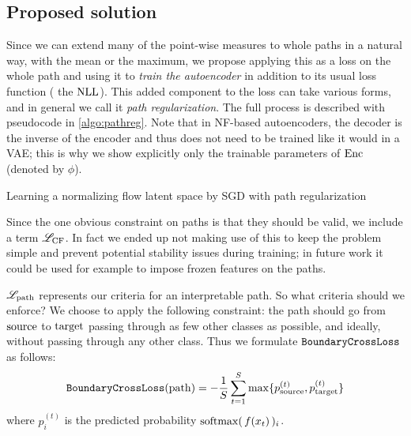 \documentclass[../main.tex]{subfiles}
\begin{document}
\subsection{Proposed solution}

Since we can extend many of the point-wise measures to whole paths in a natural way, \eg{} with the mean or the maximum, we propose applying this as a loss on the whole path and using it to \emph{train the autoencoder} in addition to its usual loss function (\eg{} the $\text{NLL}$).
This added component to the loss can take various forms, and in general we call it \emph{path regularization}.
The full process is described with pseudocode in \autoref{algo:pathreg}.
Note that in NF-based autoencoders, the decoder is the inverse of the encoder and thus does not need to be trained like it would in a VAE; this is why we show explicitly only the trainable parameters of $\operatorname{Enc}$ (denoted by $\phi$).

\begin{algorithm}
\caption{Learning a normalizing flow latent space by SGD with path regularization}
\label{algo:pathreg}
\end{algorithm}

Since the one obvious constraint on paths is that they should be valid, we include a term $\mathscr{L}_\text{CF}$.
In fact we ended up not making use of this to keep the problem simple and prevent potential stability issues during training;
in future work it could be used for example to impose frozen features on the paths.

$\mathscr{L}_\text{path}$ represents our criteria for an interpretable path. So what criteria should we enforce?
We choose to apply the following constraint: the path should go from $\mathrm{source}$ to $\mathrm{target}$ passing through as few other classes as possible, and ideally, without passing through any other class.
Thus we formulate $\mathtt{BoundaryCrossLoss}$ as follows:
\begin{align*}
\mathtt{BoundaryCrossLoss}(\mathrm{path}) = -
\frac{1}{S} \sum_{t=1}^{S}
\max \{ p^{(t)}_{\mathrm{source}}, p^{(t)}_{\mathrm{target}} \}
\end{align*}
where $p^{(t)}_i$ is the predicted probability $\mathrm{softmax}(\,f(x_t)\,)_i$.
\end{document}
